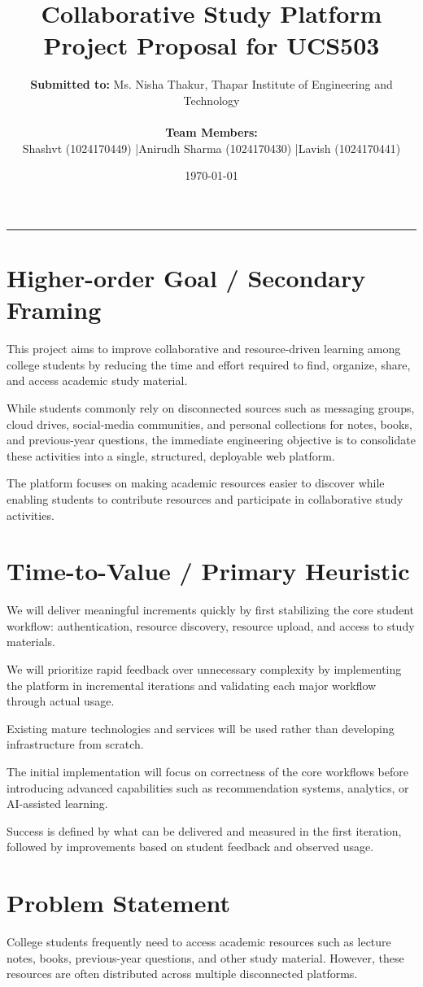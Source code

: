 \documentclass[11pt,a4paper]{article}
\title{\textbf{Collaborative Study Platform}\\ \large Project Proposal for UCS503}
\author{\textbf{Submitted to:} Ms. Nisha Thakur, Thapar Institute of Engineering and Technology \\\\
\textbf{Team Members:} \\ Shashvt (1024170449) \quad|\quad Anirudh Sharma (1024170430) \quad|\quad Lavish (1024170441)}
\date{\today}
\begin{document}
\maketitle

\hrule
\vspace{1em}

\section{Higher-order Goal / Secondary Framing}
This project aims to improve collaborative and resource-driven learning among college students by reducing the time and effort required to find, organize, share, and access academic study material.

While students commonly rely on disconnected sources such as messaging groups, cloud drives, social-media communities, and personal collections for notes, books, and previous-year questions, the immediate engineering objective is to consolidate these activities into a single, structured, deployable web platform.

The platform focuses on making academic resources easier to discover while enabling students to contribute resources and participate in collaborative study activities.

\section{Time-to-Value / Primary Heuristic}
We will deliver meaningful increments quickly by first stabilizing the core student workflow: authentication, resource discovery, resource upload, and access to study materials.

We will prioritize rapid feedback over unnecessary complexity by implementing the platform in incremental iterations and validating each major workflow through actual usage.

Existing mature technologies and services will be used rather than developing infrastructure from scratch.

The initial implementation will focus on correctness of the core workflows before introducing advanced capabilities such as recommendation systems, analytics, or AI-assisted learning.

Success is defined by what can be delivered and measured in the first iteration, followed by improvements based on student feedback and observed usage.

\section{Problem Statement}
College students frequently need to access academic resources such as lecture notes, books, previous-year questions, and other study material. However, these resources are often distributed across multiple disconnected platforms.
\end{document}
